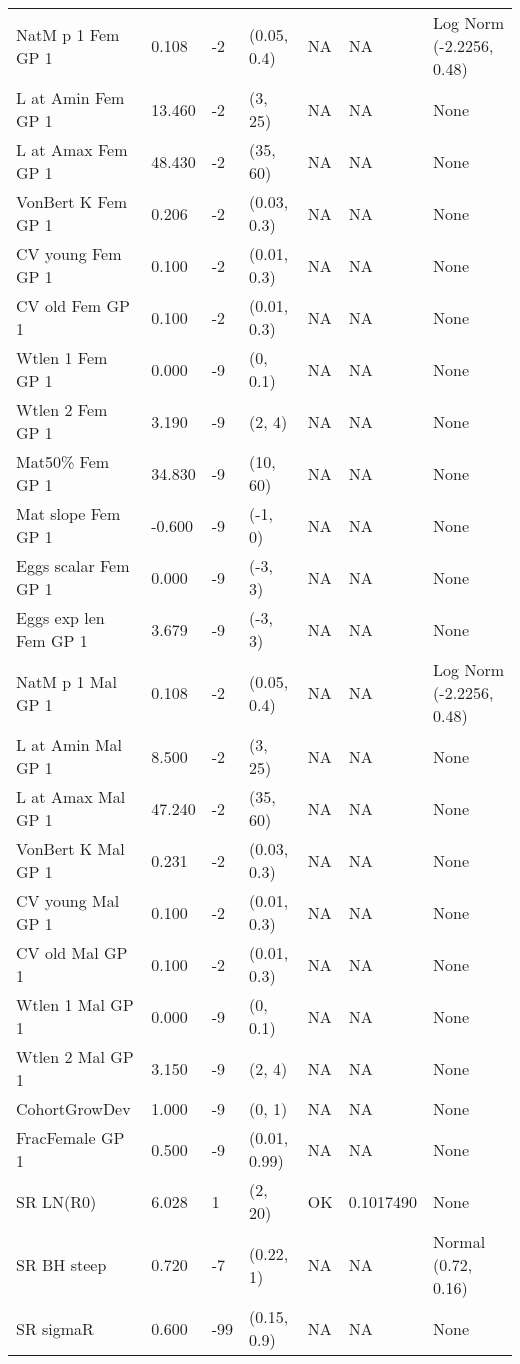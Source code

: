 \documentclass[11pt,
  english,
  a4paper,
]{article}
\begin{document}
\begin{landscape}
\begin{longtable}[t]{>{\raggedright\arraybackslash}p{8.5cm}lllll>{\raggedright\arraybackslash}p{4cm}}
\endfoot
\bottomrule
\endlastfoot
NatM p 1 Fem GP 1 & 0.108 & -2 & (0.05, 0.4) & NA & NA & Log Norm (-2.2256, 0.48)\\
L at Amin Fem GP 1 & 13.460 & -2 & (3, 25) & NA & NA & None\\
L at Amax Fem GP 1 & 48.430 & -2 & (35, 60) & NA & NA & None\\
VonBert K Fem GP 1 & 0.206 & -2 & (0.03, 0.3) & NA & NA & None\\
CV young Fem GP 1 & 0.100 & -2 & (0.01, 0.3) & NA & NA & None\\
CV old Fem GP 1 & 0.100 & -2 & (0.01, 0.3) & NA & NA & None\\
Wtlen 1 Fem GP 1 & 0.000 & -9 & (0, 0.1) & NA & NA & None\\
Wtlen 2 Fem GP 1 & 3.190 & -9 & (2, 4) & NA & NA & None\\
Mat50\% Fem GP 1 & 34.830 & -9 & (10, 60) & NA & NA & None\\
Mat slope Fem GP 1 & -0.600 & -9 & (-1, 0) & NA & NA & None\\
Eggs scalar Fem GP 1 & 0.000 & -9 & (-3, 3) & NA & NA & None\\
Eggs exp len Fem GP 1 & 3.679 & -9 & (-3, 3) & NA & NA & None\\
NatM p 1 Mal GP 1 & 0.108 & -2 & (0.05, 0.4) & NA & NA & Log Norm (-2.2256, 0.48)\\
L at Amin Mal GP 1 & 8.500 & -2 & (3, 25) & NA & NA & None\\
L at Amax Mal GP 1 & 47.240 & -2 & (35, 60) & NA & NA & None\\
VonBert K Mal GP 1 & 0.231 & -2 & (0.03, 0.3) & NA & NA & None\\
CV young Mal GP 1 & 0.100 & -2 & (0.01, 0.3) & NA & NA & None\\
CV old Mal GP 1 & 0.100 & -2 & (0.01, 0.3) & NA & NA & None\\
Wtlen 1 Mal GP 1 & 0.000 & -9 & (0, 0.1) & NA & NA & None\\
Wtlen 2 Mal GP 1 & 3.150 & -9 & (2, 4) & NA & NA & None\\
CohortGrowDev & 1.000 & -9 & (0, 1) & NA & NA & None\\
FracFemale GP 1 & 0.500 & -9 & (0.01, 0.99) & NA & NA & None\\
SR LN(R0) & 6.028 & 1 & (2, 20) & OK & 0.1017490 & None\\
SR BH steep & 0.720 & -7 & (0.22, 1) & NA & NA & Normal (0.72, 0.16)\\
SR sigmaR & 0.600 & -99 & (0.15, 0.9) & NA & NA & None\\

\end{longtable}
\end{landscape}
\end{document}

